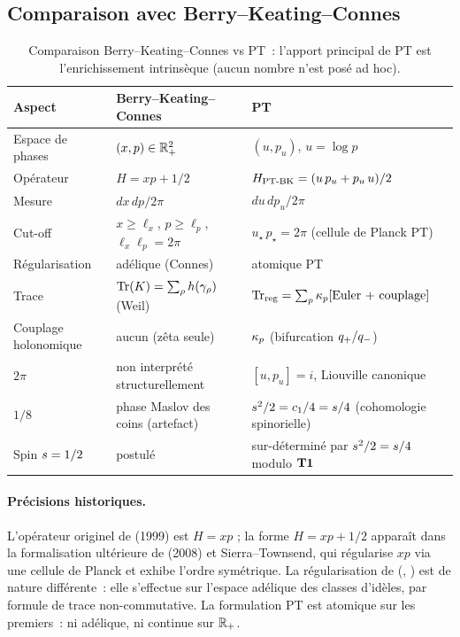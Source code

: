 \subsection{Comparaison avec Berry--Keating--Connes}
\label{sec:comparaison_BKC}

\begin{table}[ht]
\centering
\small
\begin{tabular}{@{}p{3cm}p{4.5cm}p{5cm}@{}}
\toprule
\textbf{Aspect} & \textbf{Berry--Keating--Connes} & \textbf{PT}\\
\midrule
Espace de phases & $(x, p) \in \mathbb{R}_+^{2}$ & $(u, p_u)$, $u = \log p$\\
Opérateur & $H = xp + 1/2$ & $H_{\mathrm{PT\text{-}BK}} = (u\,p_u + p_u\,u)/2$\\
Mesure & $dx\,dp / 2\pi$ & $du\,dp_u / 2\pi$\\
Cut-off & $x \ge \ell_x$, $p \ge \ell_p$, $\ell_x \ell_p = 2\pi$ & $u_\star\,p_\star = 2\pi$ (cellule de Planck PT)\\
Régularisation & adélique (Connes) & atomique PT\\
Trace & $\operatorname{Tr}(K) = \sum_\rho h(\gamma_\rho)$ (Weil) & $\operatorname{Tr}_{\mathrm{reg}} = \sum_p \kappa_p [\text{Euler + couplage}]$\\
Couplage holonomique & aucun (zêta seule) & $\kappa_p$ (bifurcation $q_{+}/q_{-}$)\\
$2\pi$ & non interprété structurellement & $[u, p_u] = i$, Liouville canonique\\
$1/8$ & phase Maslov des coins (artefact) & $s^{2}/2 = c_1/4 = s/4$ (cohomologie spinorielle)\\
Spin $s = 1/2$ & postulé & sur-déterminé par $s^{2}/2 = s/4$ modulo $\textbf{T1}$\\
\bottomrule
\end{tabular}
\caption{Comparaison Berry--Keating--Connes vs PT~: l'apport principal de
PT est l'enrichissement intrinsèque (aucun nombre n'est posé ad hoc).}
\label{tab:comparaison_BKC}
\end{table}

\paragraph{Précisions historiques.}
L'opérateur originel de \citeauthor{BerryKeating1999} (1999) est
$H = xp$ ; la forme $H = xp + 1/2$ apparaît dans la formalisation
ultérieure de \citeauthor{Sierra2008} (2008) et Sierra--Townsend, qui
régularise $xp$ via une cellule de Planck et exhibe l'ordre symétrique.
La régularisation de \citeauthor{Connes1996} (\citeyear{Connes1996},
\citeyear{Connes1999}) est de nature différente~: elle s'effectue sur
l'espace adélique des classes d'idèles, par formule de trace
non-commutative. La formulation PT est atomique sur les premiers~: ni
adélique, ni continue sur $\mathbb{R}_+$.

